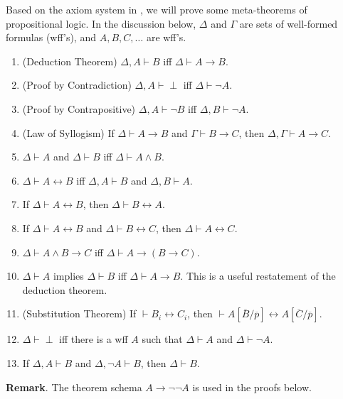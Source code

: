 \documentclass[12pt]{article}
\begin{document}
Based on the axiom system in , we will prove some meta-theorems of propositional logic.  In the discussion below, $\Delta$ and $\Gamma$ are sets of well-formed formulas (wff's), and $A,B,C,\ldots$ are wff's. 

\begin{enumerate}
\item (Deduction Theorem) $\Delta,A\vdash B$ iff $\Delta\vdash A\to B$.
\item (Proof by Contradiction) $\Delta,A\vdash \perp$ iff $\Delta \vdash \neg A$.
\item (Proof by Contrapositive) $\Delta,A\vdash \neg B$ iff $\Delta, B\vdash \neg A$.
\item (Law of Syllogism) If $\Delta \vdash A\to B$ and $\Gamma \vdash B\to C$, then $\Delta, \Gamma \vdash A\to C$.
\item $\Delta \vdash A$ and $\Delta \vdash B$ iff $\Delta \vdash A\land B$.
\item $\Delta \vdash A\leftrightarrow B$ iff $\Delta, A \vdash B$ and $\Delta, B \vdash A$.
\item If $\Delta \vdash A\leftrightarrow B$, then $\Delta \vdash B\leftrightarrow A$.
\item If $\Delta \vdash A\leftrightarrow B$ and $\Delta \vdash B\leftrightarrow C$, then $\Delta \vdash A \leftrightarrow C$.
\item $\Delta\vdash A\land B\to C$ iff $\Delta \vdash A \to (B\to C)$.
\item $\Delta \vdash A$ implies $\Delta \vdash B$ iff $\Delta \vdash A\to B$.  This is a useful restatement of the deduction theorem.
\item (Substitution Theorem) If $\vdash B_i \leftrightarrow C_i$, then $\vdash A[\overline{B}/\overline{p}] \leftrightarrow A[\overline{C}/\overline{p}]$.
\item $\Delta \vdash \perp$ iff there is a wff $A$ such that $\Delta \vdash A$ and $\Delta \vdash \neg A$.
\item If $\Delta,A\vdash B$ and $\Delta,\neg A\vdash B$, then $\Delta \vdash B$.
\end{enumerate}

\textbf{Remark}.  The theorem schema $A\to \neg \neg A$ is used in the proofs below.
\end{document}
